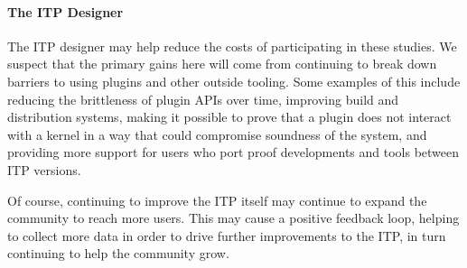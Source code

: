 \paragraph{The ITP Designer}
The ITP designer may help reduce the costs of participating in these studies. 
We suspect that the primary gains here will come from continuing to 
break down barriers to using plugins and other outside tooling. 
Some examples of this include reducing the brittleness of plugin APIs 
over time, improving build and distribution systems, making it possible 
to prove that a plugin does not interact with a kernel in a way that 
could compromise soundness of the system, 
and providing more support for users who port proof developments
and tools between ITP versions.

Of course, continuing to improve the ITP itself may continue 
to expand the community to reach more users. 
This may cause a positive feedback loop, helping to collect more data 
in order to drive further improvements to the ITP, in turn continuing to help
the community grow.


